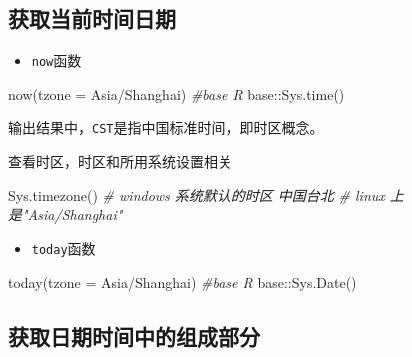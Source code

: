\documentclass[
]{book}
\newenvironment{Shaded}{\begin{snugshade}}{\end{snugshade}}
\newcommand{\AttributeTok}[1]{\textcolor[rgb]{0.77,0.63,0.00}{#1}}
\newcommand{\CommentTok}[1]{\textcolor[rgb]{0.56,0.35,0.01}{\textit{#1}}}
\newcommand{\FunctionTok}[1]{\textcolor[rgb]{0.00,0.00,0.00}{#1}}
\newcommand{\NormalTok}[1]{#1}
\newcommand{\SpecialCharTok}[1]{\textcolor[rgb]{0.00,0.00,0.00}{#1}}
\newcommand{\StringTok}[1]{\textcolor[rgb]{0.31,0.60,0.02}{#1}}
\providecommand{\tightlist}{%
  \setlength{\itemsep}{0pt}\setlength{\parskip}{0pt}}
\begin{document}
\hypertarget{ux83b7ux53d6ux5f53ux524dux65f6ux95f4ux65e5ux671f}{%
\subsection{获取当前时间日期}\label{ux83b7ux53d6ux5f53ux524dux65f6ux95f4ux65e5ux671f}}

\begin{itemize}
\tightlist
\item
  \texttt{now}函数
\end{itemize}

\begin{Shaded}
\begin{Highlighting}[]
\FunctionTok{now}\NormalTok{(}\AttributeTok{tzone =} \StringTok{\textquotesingle{}Asia/Shanghai\textquotesingle{}}\NormalTok{)}
\CommentTok{\#base R}
\NormalTok{base}\SpecialCharTok{::}\FunctionTok{Sys.time}\NormalTok{()}
\end{Highlighting}
\end{Shaded}

输出结果中，\texttt{CST}是指中国标准时间，即时区概念。

查看时区，时区和所用系统设置相关

\begin{Shaded}
\begin{Highlighting}[]
\FunctionTok{Sys.timezone}\NormalTok{()}
\CommentTok{\# windows 系统默认的时区 中国台北}
\CommentTok{\# linux 上是"Asia/Shanghai"}
\end{Highlighting}
\end{Shaded}

\begin{itemize}
\tightlist
\item
  \texttt{today}函数
\end{itemize}

\begin{Shaded}
\begin{Highlighting}[]
\FunctionTok{today}\NormalTok{(}\AttributeTok{tzone =} \StringTok{\textquotesingle{}Asia/Shanghai\textquotesingle{}}\NormalTok{)}
\CommentTok{\#base R}
\NormalTok{base}\SpecialCharTok{::}\FunctionTok{Sys.Date}\NormalTok{()}
\end{Highlighting}
\end{Shaded}

\hypertarget{ux83b7ux53d6ux65e5ux671fux65f6ux95f4ux4e2dux7684ux7ec4ux6210ux90e8ux5206}{%
\subsection{获取日期时间中的组成部分}\label{ux83b7ux53d6ux65e5ux671fux65f6ux95f4ux4e2dux7684ux7ec4ux6210ux90e8ux5206}}
\end{document}
